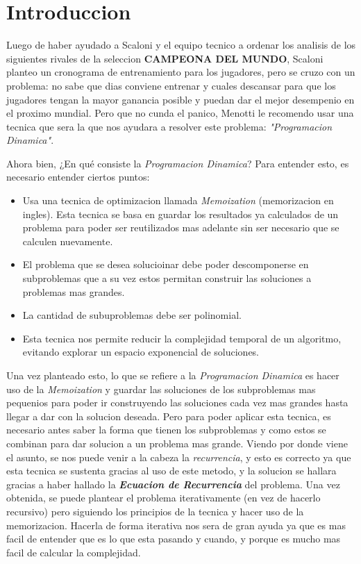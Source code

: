 \section{Introduccion}

Luego de haber ayudado a Scaloni y el equipo tecnico a ordenar los analisis de los siguientes rivales de la seleccion \textbf{CAMPEONA DEL MUNDO}, Scaloni planteo un cronograma de entrenamiento para los jugadores, pero se cruzo con un problema: no sabe que dias conviene entrenar y cuales descansar para que los jugadores tengan la mayor ganancia posible y puedan dar el mejor desempenio en el proximo mundial. Pero que no cunda el panico, Menotti le recomendo usar una tecnica que sera la que nos ayudara a resolver este problema: \textit{"Programacion Dinamica"}.

Ahora bien, ¿En qué consiste la \textit{Programacion Dinamica}? Para entender esto, es necesario entender ciertos puntos:
\begin{itemize}
    \item Usa una tecnica de optimizacion llamada \textit{Memoization} (memorizacion en ingles). Esta tecnica se basa en guardar los resultados ya calculados de un problema para poder ser reutilizados mas adelante sin ser necesario que se calculen nuevamente.
    \item El problema que se desea solucioinar debe poder descomponerse en subproblemas que a su vez estos permitan construir las soluciones a problemas mas grandes.
    \item La cantidad de subuproblemas debe ser polinomial.
    \item Esta tecnica nos permite reducir la complejidad temporal de un algoritmo, evitando explorar un espacio exponencial de soluciones.
\end{itemize}
Una vez planteado esto, lo que se refiere a la \textit{Programacion Dinamica} es hacer uso de la \textit{Memoization} y guardar las soluciones de los subproblemas mas pequenios para poder ir construyendo las soluciones cada vez mas grandes hasta llegar a dar con la solucion deseada. Pero para poder aplicar esta tecnica, es necesario antes saber la forma que tienen los subproblemas y como estos se combinan para dar solucion a un problema mas grande. 
Viendo por donde viene el asunto, se nos puede venir a la cabeza la \textit{recurrencia}, y esto es correcto ya que esta tecnica se sustenta gracias al uso de este metodo, y la solucion se hallara gracias a haber hallado la \textbf{\textit{Ecuacion de Recurrencia}} del problema. Una vez obtenida, se puede plantear el problema iterativamente (en vez de hacerlo recursivo) pero siguiendo los principios de la tecnica y hacer uso de la memorizacion. Hacerla de forma iterativa nos sera de gran ayuda ya que es mas facil de entender que es lo que esta pasando y cuando, y porque es mucho mas facil de calcular la complejidad.

